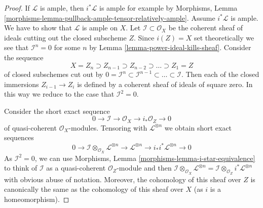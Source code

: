 \begin{proof}
If $\mathcal{L}$ is ample, then $i^*\mathcal{L}$ is ample for
example by Morphisms, Lemma
\ref{morphisms-lemma-pullback-ample-tensor-relatively-ample}.
Assume $i^*\mathcal{L}$ is ample. We have to show that $\mathcal{L}$
is ample on $X$.
Let $\mathcal{I} \subset \mathcal{O}_X$ be the coherent sheaf of ideals
cutting out the closed subscheme $Z$. Since $i(Z) = X$ set theoretically
we see that $\mathcal{I}^n = 0$ for some $n$ by
Lemma \ref{lemma-power-ideal-kills-sheaf}.
Consider the sequence
$$
X = Z_n \supset Z_{n - 1} \supset Z_{n - 2} \supset \ldots \supset Z_1 = Z
$$
of closed subschemes cut out by
$0 = \mathcal{I}^n \subset \mathcal{I}^{n - 1} \subset \ldots \subset
\mathcal{I}$. Then each of the closed immersions $Z_{i - 1} \to Z_{i}$
is defined by a coherent sheaf of ideals of square zero. In this way
we reduce to the case that $\mathcal{I}^2 = 0$.

\medskip\noindent
Consider the short exact sequence
$$
0 \to \mathcal{I} \to \mathcal{O}_X \to i_*\mathcal{O}_Z \to 0
$$
of quasi-coherent $\mathcal{O}_X$-modules. Tensoring with
$\mathcal{L}^{\otimes n}$ we obtain short exact sequences
\begin{equation}
\label{equation-ses}
0 \to \mathcal{I} \otimes_{\mathcal{O}_X} \mathcal{L}^{\otimes n}
\to \mathcal{L}^{\otimes n} \to i_*i^*\mathcal{L}^{\otimes n} \to 0
\end{equation}
As $\mathcal{I}^2 = 0$, we can use
Morphisms, Lemma \ref{morphisms-lemma-i-star-equivalence}
to think of $\mathcal{I}$ as a quasi-coherent $\mathcal{O}_Z$-module
and then $\mathcal{I} \otimes_{\mathcal{O}_X} \mathcal{L}^{\otimes n} =
\mathcal{I} \otimes_{\mathcal{O}_Z} i^*\mathcal{L}^{\otimes n}$ with
obvious abuse of notation.
Moreover, the cohomology of this sheaf over $Z$ is canonically
the same as the cohomology of this sheaf over $X$ (as $i$ is a
homeomorphism).


\end{proof}
